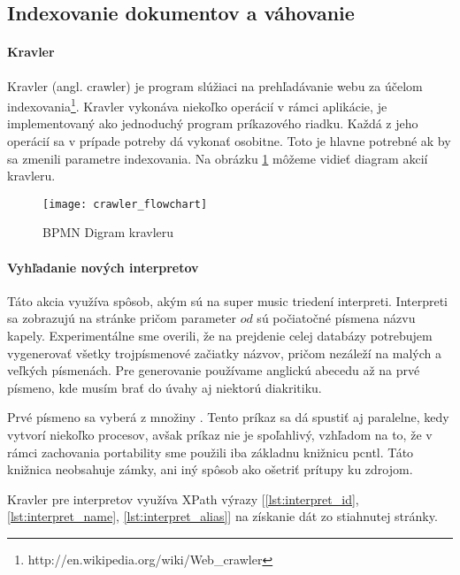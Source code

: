 \subsection{Indexovanie dokumentov a váhovanie}

\paragraph{Kravler}

Kravler (angl. crawler) je program slúžiaci na prehľadávanie webu za účelom
indexovania\footnote{http://en.wikipedia.org/wiki/Web\_crawler}. Kravler vykonáva niekoľko
operácií v rámci aplikácie, je implementovaný ako jednoduchý program príkazového riadku.
Každá z jeho operácií sa v prípade potreby dá vykonať osobitne. Toto je hlavne potrebné ak by
sa zmenili parametre indexovania. Na obrázku \ref{fig:crawler_flowchart} môžeme vidieť diagram
akcií kravleru.

\begin{figure}
    \begin{center}
        \texttt{[image: crawler\_flowchart]}
        \caption{BPMN Digram kravleru}
        \label{fig:crawler_flowchart}
    \end{center}
\end{figure}

\paragraph{Vyhľadanie nových interpretov}

Táto akcia využíva spôsob, akým sú na super music triedení interpreti.
Interpreti sa zobrazujú na stránke 
pričom parameter \(od\) sú počiatočné písmena názvu kapely. Experimentálne 
sme overili, že na prejdenie celej databázy potrebujem vygenerovať všetky trojpísmenové
začiatky názvov, pričom nezáleží na malých a veľkých písmenách. Pre generovanie používame 
anglickú abecedu až na prvé písmeno, kde musím brať do úvahy aj niektorú diakritiku.

Prvé písmeno sa vyberá z množiny 
.
Tento príkaz sa dá spustiť aj paralelne, kedy vytvorí niekoľko 
 procesov, avšak príkaz nie je spoľahlivý, vzhľadom na to, že v rámci zachovania portability 
sme použili iba základnu knižnicu pcntl. Táto knižnica neobsahuje zámky, ani iný spôsob ako 
ošetriť prítupy ku zdrojom.

Kravler pre interpretov využíva XPath výrazy
[\ref{lst:interpret_id}, \ref{lst:interpret_name}, \ref{lst:interpret_alias}] na získanie 
dát zo stiahnutej stránky.

